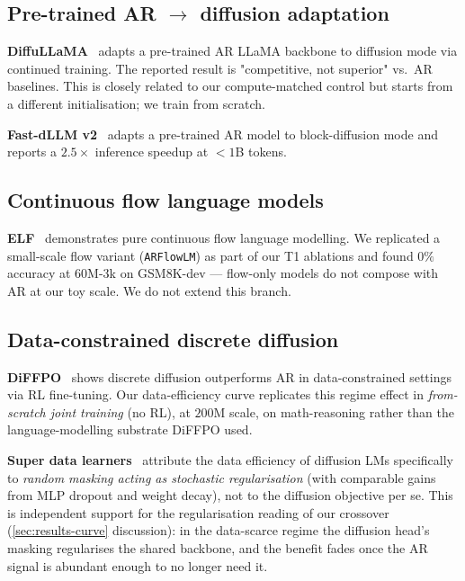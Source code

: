 \subsection{Pre-trained AR $\to$ diffusion adaptation}

\textbf{DiffuLLaMA}~\citep{gong2024diffullama} adapts a pre-trained
AR LLaMA backbone to diffusion mode via continued training. The
reported result is "competitive, not superior" vs.\ AR baselines.
This is closely related to our compute-matched control but starts
from a different initialisation; we train from scratch.

\textbf{Fast-dLLM v2}~\citep{wu2025fastdllm} adapts a pre-trained AR
model to block-diffusion mode and reports a $2.5\times$ inference
speedup at $<1$B tokens.

\subsection{Continuous flow language models}

\textbf{ELF}~\citep{chen2026elf} demonstrates pure continuous flow
language modelling. We replicated a small-scale flow variant
(\texttt{ARFlowLM}) as part of our T1 ablations and found
$0\%$ accuracy at $60$M-$3$k on GSM8K-dev --- flow-only models do not
compose with AR at our toy scale. We do not extend this branch.

\subsection{Data-constrained discrete diffusion}

\textbf{DiFFPO}~\citep{wei2025diffpo} shows discrete diffusion
outperforms AR in data-constrained settings via RL fine-tuning. Our
data-efficiency curve replicates this regime effect in
\emph{from-scratch joint training} (no RL), at $200$M scale, on
math-reasoning rather than the language-modelling substrate DiFFPO
used.

\textbf{Super data learners}~\citep{gao2025superdata} attribute the
data efficiency of diffusion LMs specifically to \emph{random masking
acting as stochastic regularisation} (with comparable gains from MLP
dropout and weight decay), not to the diffusion objective per se.
This is independent support for the regularisation reading of our
crossover (\textsection\ref{sec:results-curve} discussion): in the
data-scarce regime the diffusion head's masking regularises the
shared backbone, and the benefit fades once the AR signal is
abundant enough to no longer need it.

